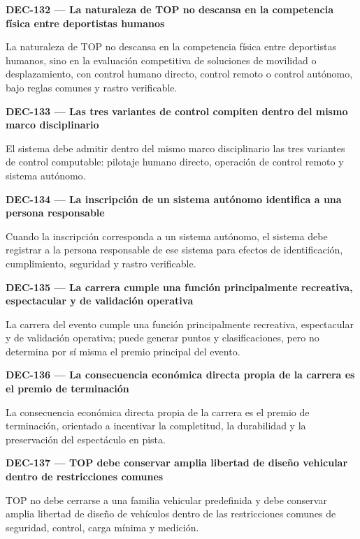 \documentclass[10pt,letterpaper]{article}
\begin{document}
\noindent\textbf{DEC-132 --- La naturaleza de TOP no descansa en la competencia física entre deportistas humanos}\par
La naturaleza de TOP no descansa en la competencia física entre deportistas humanos, sino en la evaluación competitiva de soluciones de movilidad o desplazamiento, con control humano directo, control remoto o control autónomo, bajo reglas comunes y rastro verificable.\par\vspace{0.45em}
\noindent\textbf{DEC-133 --- Las tres variantes de control compiten dentro del mismo marco disciplinario}\par
El sistema debe admitir dentro del mismo marco disciplinario las tres variantes de control computable: pilotaje humano directo, operación de control remoto y sistema autónomo.\par\vspace{0.45em}
\noindent\textbf{DEC-134 --- La inscripción de un sistema autónomo identifica a una persona responsable}\par
Cuando la inscripción corresponda a un sistema autónomo, el sistema debe registrar a la persona responsable de ese sistema para efectos de identificación, cumplimiento, seguridad y rastro verificable.\par\vspace{0.45em}
\noindent\textbf{DEC-135 --- La carrera cumple una función principalmente recreativa, espectacular y de validación operativa}\par
La carrera del evento cumple una función principalmente recreativa, espectacular y de validación operativa; puede generar puntos y clasificaciones, pero no determina por sí misma el premio principal del evento.\par\vspace{0.45em}
\noindent\textbf{DEC-136 --- La consecuencia económica directa propia de la carrera es el premio de terminación}\par
La consecuencia económica directa propia de la carrera es el premio de terminación, orientado a incentivar la completitud, la durabilidad y la preservación del espectáculo en pista.\par\vspace{0.45em}
\noindent\textbf{DEC-137 --- TOP debe conservar amplia libertad de diseño vehicular dentro de restricciones comunes}\par
TOP no debe cerrarse a una familia vehicular predefinida y debe conservar amplia libertad de diseño de vehículos dentro de las restricciones comunes de seguridad, control, carga mínima y medición.\par\vspace{0.45em}
\end{document}
